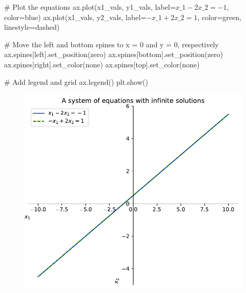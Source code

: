 \documentclass[
  letterpaper,
  DIV=11,
  numbers=noendperiod]{scrreprt}
\newenvironment{Shaded}{\begin{snugshade}}{\end{snugshade}}
\newcommand{\CommentTok}[1]{\textcolor[rgb]{0.37,0.37,0.37}{#1}}
\newcommand{\NormalTok}[1]{\textcolor[rgb]{0.00,0.23,0.31}{#1}}
\newcommand{\OperatorTok}[1]{\textcolor[rgb]{0.37,0.37,0.37}{#1}}
\newcommand{\StringTok}[1]{\textcolor[rgb]{0.13,0.47,0.30}{#1}}
\begin{document}
\begin{Shaded}
\begin{Highlighting}[]
\CommentTok{\# Plot the equations}
\NormalTok{ax.plot(x1\_vals, y1\_vals, label}\OperatorTok{=}\StringTok{\textquotesingle{}$x\_1 {-} 2x\_2 = {-}1$\textquotesingle{}}\NormalTok{, color}\OperatorTok{=}\StringTok{\textquotesingle{}blue\textquotesingle{}}\NormalTok{)}
\NormalTok{ax.plot(x1\_vals, y2\_vals, label}\OperatorTok{=}\StringTok{\textquotesingle{}${-}x\_1 + 2x\_2 = 1$\textquotesingle{}}\NormalTok{, color}\OperatorTok{=}\StringTok{\textquotesingle{}green\textquotesingle{}}\NormalTok{, linestyle}\OperatorTok{=}\StringTok{\textquotesingle{}dashed\textquotesingle{}}\NormalTok{)}

\CommentTok{\# Move the left and bottom spines to x = 0 and y = 0, respectively}
\NormalTok{ax.spines[}\StringTok{\textquotesingle{}left\textquotesingle{}}\NormalTok{].set\_position(}\StringTok{\textquotesingle{}zero\textquotesingle{}}\NormalTok{)}
\NormalTok{ax.spines[}\StringTok{\textquotesingle{}bottom\textquotesingle{}}\NormalTok{].set\_position(}\StringTok{\textquotesingle{}zero\textquotesingle{}}\NormalTok{)}
\NormalTok{ax.spines[}\StringTok{\textquotesingle{}right\textquotesingle{}}\NormalTok{].set\_color(}\StringTok{\textquotesingle{}none\textquotesingle{}}\NormalTok{)}
\NormalTok{ax.spines[}\StringTok{\textquotesingle{}top\textquotesingle{}}\NormalTok{].set\_color(}\StringTok{\textquotesingle{}none\textquotesingle{}}\NormalTok{)}

\CommentTok{\# Add legend and grid}
\NormalTok{ax.legend()}
\NormalTok{plt.show()}
\end{Highlighting}
\end{Shaded}

\begin{figure}[H]

{\centering \includegraphics{p1_files/figure-pdf/cell-7-output-1.pdf}

}

\end{figure}
\end{document}
